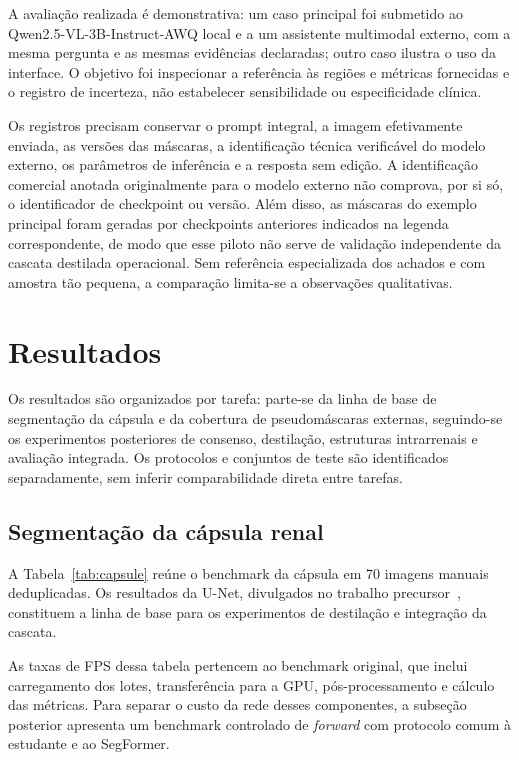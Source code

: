 \documentclass[12pt]{article}
\begin{document}
A avaliação realizada é demonstrativa: um caso principal foi submetido ao Qwen2.5-VL-3B-Instruct-AWQ local e a um assistente multimodal externo, com a mesma pergunta e as mesmas evidências declaradas; outro caso ilustra o uso da interface. O objetivo foi inspecionar a referência às regiões e métricas fornecidas e o registro de incerteza, não estabelecer sensibilidade ou especificidade clínica.

Os registros precisam conservar o prompt integral, a imagem efetivamente enviada, as versões das máscaras, a identificação técnica verificável do modelo externo, os parâmetros de inferência e a resposta sem edição. A identificação comercial anotada originalmente para o modelo externo não comprova, por si só, o identificador de checkpoint ou versão. Além disso, as máscaras do exemplo principal foram geradas por checkpoints anteriores indicados na legenda correspondente, de modo que esse piloto não serve de validação independente da cascata destilada operacional. Sem referência especializada dos achados e com amostra tão pequena, a comparação limita-se a observações qualitativas.

\section{Resultados}
Os resultados são organizados por tarefa: parte-se da linha de base de segmentação da cápsula e da cobertura de pseudomáscaras externas, seguindo-se os experimentos posteriores de consenso, destilação, estruturas intrarrenais e avaliação integrada. Os protocolos e conjuntos de teste são identificados separadamente, sem inferir comparabilidade direta entre tarefas.

\subsection{Segmentação da cápsula renal}

A Tabela~\ref{tab:capsule} reúne o benchmark da cápsula em 70 imagens manuais deduplicadas. Os resultados da U-Net, divulgados no trabalho precursor~\cite{Anjos2026SBBD}, constituem a linha de base para os experimentos de destilação e integração da cascata.

As taxas de FPS dessa tabela pertencem ao benchmark original, que inclui
carregamento dos lotes, transferência para a GPU, pós-processamento e cálculo
das métricas. Para separar o custo da rede desses componentes, a subseção
posterior apresenta um benchmark controlado de \textit{forward} com protocolo
comum à estudante e ao SegFormer.
\end{document}

